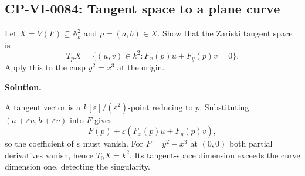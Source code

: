 
\subsection*{CP-VI-0084: Tangent space to a plane curve}

Let $X=V(F)\subseteq\mathbb A_k^2$ and $p=(a,b)\in X$. Show that the Zariski tangent space is
\[
T_pX=\{(u,v)\in k^2:F_x(p)u+F_y(p)v=0\}.
\]
Apply this to the cusp $y^2=x^3$ at the origin.

\medskip
\noindent\textbf{Solution.}

A tangent vector is a $k[\varepsilon]/(\varepsilon^2)$-point reducing to $p$. Substituting $(a+\varepsilon u,b+\varepsilon v)$ into $F$ gives
\[
F(p)+\varepsilon(F_x(p)u+F_y(p)v),
\]
so the coefficient of $\varepsilon$ must vanish. For $F=y^2-x^3$ at $(0,0)$ both partial derivatives vanish, hence $T_0X=k^2$. Its tangent-space dimension exceeds the curve dimension one, detecting the singularity.
